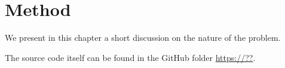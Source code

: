 \chapter{Method}
\label{chap:method} 
We present in this chapter a short discussion on the nature of the problem. 

The source code itself can be found in the GitHub folder \url{https://??}.
